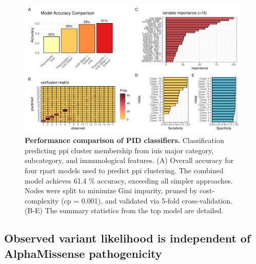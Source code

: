 \begin{figure}[h]
  \centering
  \includegraphics[width=0.99\textwidth]{../images/plot_multicat_performance_combined.pdf}
  \caption{\textbf{Performance comparison of PID classifiers.} Classification predicting \ac{ppi} cluster membership from \ac{iuis} major category, subcategory, and immunological features. (A) Overall accuracy for four rpart models
used to predict \ac{ppi} clustering. The combined model achieves 61.4 \% accuracy, exceeding all simpler approaches. 
Nodes were split to minimize Gini impurity, pruned by cost-complexity (cp = 0.001), and validated via 5‑fold cross‑validation. %
(B-E) The summary statistics from the top model are detailed.  
}
  \label{fig:multicat_performance_combined}
\end{figure}


\FloatBarrier
\clearpage

\subsection{Observed variant likelihood is independent of AlphaMissense pathogenicity}

